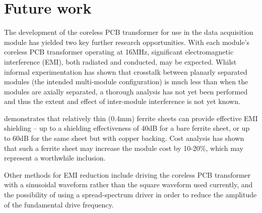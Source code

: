 \documentclass[conference]{IEEEtran}
\begin{document}

\section{Future work}
The development of the coreless PCB transformer for use in the data acquisition module has yielded two key further research opportunities.  
With each module's coreless PCB transformer operating at 16MHz, significant electromagnetic interference (EMI), both radiated and conducted, may be expected.  Whilst informal experimentation has shown that crosstalk between planarly separated modules (the intended multi-module configuration) is much less than when the modules are axially separated, a thorough analysis has not yet been performed and thus the extent and effect of inter-module interference is not yet known.  

\cite{EMIShield} demonstrates that relatively thin (0.4mm) ferrite sheets can provide effective EMI shielding -- up to a shielding effectiveness of 40dB for a bare ferrite sheet, or up to 60dB for the same sheet but with copper backing.  Cost analysis has shown that such a ferrite sheet may increase the module cost by 10-20\%, which may represent a worthwhile inclusion.

Other methods for EMI reduction include driving the coreless PCB transformer with a sinusoidal waveform rather than the square waveform used currently, and the possibility of using a spread-spectrum driver in order to reduce the amplitude of the fundamental drive frequency.
\end{document}
